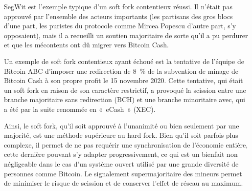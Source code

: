 SegWit est l'exemple typique d'un soft fork contentieux réussi. Il n'était pas approuvé par l'ensemble des acteurs importants (les partisans des gros blocs d'une part, les puristes du protocole comme Mircea Popescu d'autre part, s'y opposaient), mais il a recueilli un soutien majoritaire de sorte qu'il a pu perdurer et que les  mécontents ont dû migrer vers Bitcoin Cash.

Un exemple de soft fork contentieux ayant échoué est la tentative de l'équipe de Bitcoin ABC d'imposer une redirection de 8~\% de la subvention de minage de Bitcoin Cash à son propre profit le 15 novembre 2020. Cette tentative, qui était un soft fork en raison de son caractère restrictif, a provoqué la scission entre une branche majoritaire sans redirection (BCH) et une branche minoritaire avec, qui a été par la suite renommée en «~eCash~» (XEC).

Ainsi, le soft fork, qu'il soit approuvé à l'unanimité ou bien seulement par une majorité, est une méthode supérieure au hard fork. Bien qu'il soit parfois plus complexe, il permet de ne pas requérir une synchronisation de l'économie entière, cette dernière pouvant s'y adapter progressivement, ce qui est un bienfait non négligeable dans le cas d'un système ouvert utilisé par une grande diversité de personnes comme Bitcoin. Le signalement supermajoritaire des mineurs permet de minimiser le risque de scission et de conserver l'effet de réseau au maximum.


